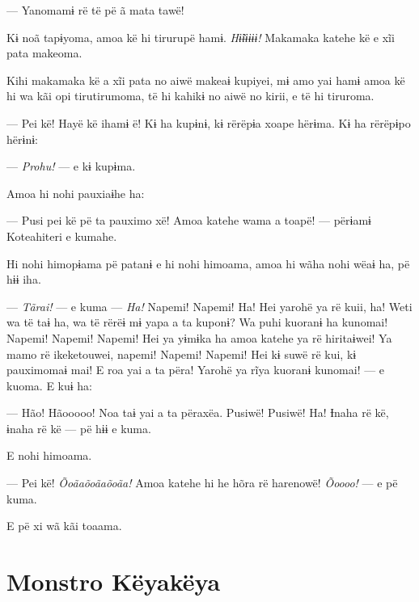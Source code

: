 --- Yanomamɨ rë të pë ã mata tawë! 

Kɨ noã tapɨyoma, amoa kë hi tirurupë hamɨ. \textit{Hɨ̃ɨɨɨɨɨ! }Makamaka katehe kë e
xĩi pata makeoma. 



Kihi makamaka kë a xĩi pata no aiwë makeaɨ kupiyei, mɨ amo yai hamɨ amoa
kë hi wa kãi opi tirutirumoma, të hi kahikɨ no aiwë no kirii, e të hi
tiruroma. 


--- Pei kë! Hayë kë ihamɨ ë! Kɨ ha kupɨnɨ, kɨ rërëpɨa xoape hërɨma. Kɨ
ha rërëpɨpo hërɨnɨ: 

--- \textit{Prohu!} --- e kɨ kupɨma. 

Amoa hi nohi pauxiaɨhe ha: 

--- Pusi pei kë pë ta pauximo xë! Amoa katehe wama a toapë! --- përɨamɨ
Koteahiteri e kumahe. 

Hi nohi himopɨama pë patanɨ e hi nohi himoama, amoa hi wãha nohi wëaɨ
ha, pë hɨɨ iha. 

--- \textit{Tãrai!} --- e kuma --- \textit{Ha!} Napemi! Napemi! Ha! Hei yarohë ya rë kuii,
ha! Weti wa të taɨ ha, wa të rërëɨ mɨ yapa a ta kuponɨ? Wa puhi kuoranɨ
ha kunomai! Napemi! Napemi! Napemi! Hei ya yɨmɨka ha amoa katehe ya rë
hiritaɨwei! Ya mamo rë ikeketouwei, napemi! Napemi! Napemi! Hei kɨ suwë
rë kui, kɨ pauximomaɨ mai! E roa yai a ta përa! Yarohë ya rĩya kuoranɨ
kunomai! --- e kuoma. E kuɨ ha: 

--- Hão! Hãooooo! Noa taɨ yai a ta përaxëa. Pusiwë! Pusiwë! Ha! Ɨnaha rë
kë, ɨnaha rë kë --- pë hɨɨ e kuma. 

E nohi himoama. 

--- Pei kë! \textit{Õoãaõoãaõoãa!} Amoa katehe hi he hõra rë harenowë! \textit{Õoooo!} ---
e pë kuma. 

E pë xi wã kãi toaama.

\chapter{Monstro Këyakëya}
 
